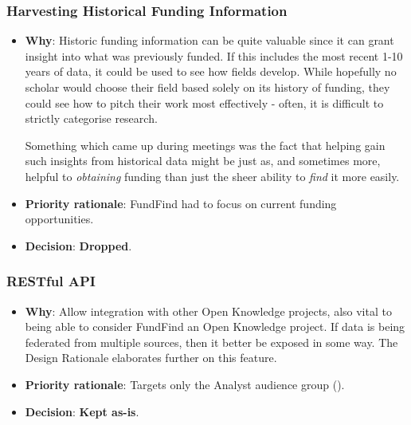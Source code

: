 \subsubsection{Harvesting Historical Funding Information}
\label{devprocess-feats-harvesting-historical-info}
\begin{itemize}
 \item \textbf{Why}: Historic funding information can be quite valuable since it can grant insight into what was previously funded. If this includes the most recent 1-10 years of data, it could be used to see how fields develop. While hopefully no scholar would choose their field based solely on its history of funding, they could see how to pitch their work most effectively - often, it is difficult to strictly categorise research.
 
 Something which came up during meetings was the fact that helping gain such insights from historical data might be just as, and sometimes more, helpful to \emph{obtaining} funding than just the sheer ability to \emph{find} it more easily.
 \item \textbf{Priority rationale}: FundFind had to focus on current funding opportunities.
 \item \textbf{Decision}: \textbf{Dropped}.
\end{itemize}

\subsubsection{RESTful API}
\begin{itemize}
 \item \textbf{Why}: Allow integration with other Open Knowledge projects, also vital to being able to consider FundFind an Open Knowledge project. If data is being federated from multiple sources, then it better be exposed in some way. The Design Rationale  elaborates further on this feature.
 \item \textbf{Priority rationale}: Targets only the Analyst audience group ().
 \item \textbf{Decision}: \textbf{Kept as-is}.
\end{itemize}

